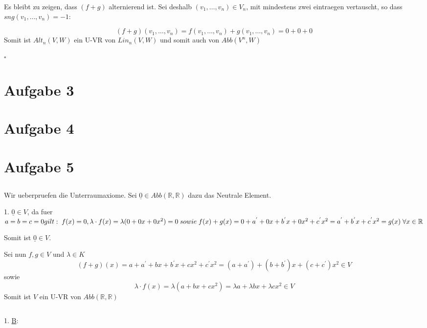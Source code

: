 \documentclass{article}
\begin{document}
  Es bleibt zu zeigen, dass $(f + g)$ alternierend ist. Sei deshalb $(v_{1}, \dots, v_{n}) \in V_{n}$, mit mindestens zwei eintraegen vertauscht, so dass $sng(v_{1},\dots,v_{n}) = -1$:

  $$ (f + g)(v_{1}, \dots, v_{n}) =  f(v_{1},\dots, v_{n}) + g(v_{1},\dots,v_{n}) = 0 + 0 + 0$$
  Somit ist $Alt_{n}(V,W)$ ein U-VR von $Lin_{n}(V,W)$ und somit auch von $Abb(V^{n},W)$

  \hfill $\square$
\section{Aufgabe 3}
\section{Aufgabe 4}
\section{Aufgabe 5}
\subsection{}
Wir ueberpruefen die Unterraumaxiome. Sei $\underline{0} \in Abb(\mathbb{R}, \mathbb{R})$ dazu das Neutrale Element.

1. $\underline{0} \in V$, da fuer $a = b = c = 0 gilt: \; f(x) = 0, \newline
\lambda \cdot f(x) = \lambda(0 + 0x + 0x^{2}) = 0 \; sowie \; f(x) + g(x) = 0 + a^{'} + 0x + b^{'}x + 0x^{2} + c^{'}x^{2} = a^{'} + b^{'}x + c^{'}x^{2} = g(x)\; \forall x \in \mathbb{R}$

Somit ist $\underline{0} \in V$.



Sei nun $f,g \in V$ und $\lambda \in K$
$$(f + g)(x) = a + a^{'} + bx + b^{'}x + cx^{2} + c^{'}x^{2} = (a+a^{'}) + (b + b^{'})x + (c + c^{'})x^{2} \in V $$
sowie
$$ \lambda \cdot f(x) = \lambda (a + bx + cx^{2}) = \lambda a + \lambda bx + \lambda cx^{2} \in V$$
Somit ist $V$ ein U-VR von $Abb(\mathbb{R},\mathbb{R})$
\subsection{}
1. \underline{B}:
\end{document}
